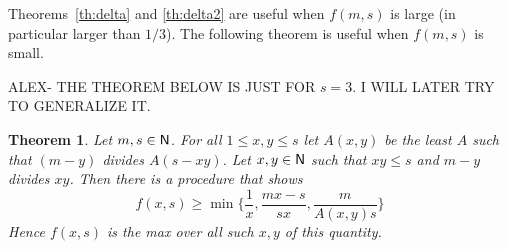 \documentclass[12pt]{article}
\newcommand{\nat}{{\sf N}}
\newtheorem{theoremfoo}{Theorem}[section] %
\newenvironment{theorem}{\pagebreak[1]\begin{theoremfoo}}{\end{theoremfoo}}
\newenvironment{proof}
    {\pagebreak[1]{\narrower\noindent {\bf Proof:\quad\nopagebreak}}}{\QED}
\newcommand{\yyskip}{\penalty-50\vskip 5pt plus 3pt minus 2pt}
\newcommand{\blackslug}{\hbox{\hskip 1pt
        \vrule width 4pt height 8pt depth 1.5pt\hskip 1pt}}
\newcommand{\QED}{{\penalty10000\parindent 0pt\penalty10000
        \hskip 8 pt\nolinebreak\blackslug\hfill\lower 8.5pt\null}
        \par\yyskip\pagebreak[1]}
\begin{document}
\begin{comment}
\begin{theorem}\label{th:delta}
Let $m,s\in\nat$ and $0<\delta \le \frac{1}{2}$.
Assume there exists $x_1,y_1,x_2,y_2\in\nat$ such that the following hold:
\begin{enumerate}
\item
$x_1y_1=x_2y_2 \le m$.
\item
$x_1+x_2=s$.
\item
$y_1\delta = \frac{m}{s}$.
\item
$y_2(1-\delta) + \frac{m-x_1y_1}{x_2} = \frac{m}{s}$.
\item
$2m-2x_1y_1\equiv 0 \pmod {x_2}$.
\end{enumerate}
Then $f(m,s) \ge \min\{\delta,1-\delta\}$.
\end{theorem}

\begin{proof}

The following procedure show $f(m,s) \ge \min\{\delta,1-\delta\}$.

\begin{enumerate}
\item
$M_1,\ldots,\ldots,M_{x_1y_1}$ are divided $(\delta,1-\delta)$. 
(There are $x_1y_1$ $\delta$-sized pieces and $x_2y_2$ $(1-\delta)$-sized pieces).
\item
$M_{x_1y_1+1},\ldots,M_m$ are divided $(\frac{1}{2},\frac{1}{2})$. 
(There are $2m-2x_1y_1$ $\frac{1}{2}$-sized pieces.)
\item
$S_1,\ldots,S_{x_1}$ each get $y_1$ $\delta$-sized pieces. 
(Each get $y_1\delta=\frac{m}{s}$.)
\item
$S_{x_1+1},\ldots,S_s$ each get $y_2$ $(1-\delta)$-sized pieces and 
$\frac{2m-2x_1y_1}{x_2}$ $\frac{1}{2}$-sized pieces.

(Each get $y_2(1-\delta) + \frac{2m-2x_1y_1}{x_2}\times\frac{1}{2} = \frac{m}{s}$.)
\end{enumerate}
\end{proof}
\end{comment}

Theorems~\ref{th:delta} and \ref{th:delta2} are useful when $f(m,s)$ is large
(in particular larger than $1/3$). The following theorem is useful when $f(m,s)$ is small.

ALEX- THE THEOREM BELOW IS JUST FOR $s=3$. I WILL LATER TRY TO GENERALIZE IT.

\vfill\eject

\begin{theorem}\label{th:three}
Let $m,s\in\nat$. For all $1\le x,y\le s$ let $A(x,y)$ be the least
$A$ such that $(m-y)$ divides $A(s-xy)$.
Let $x,y\in \nat$ such that 
$xy\le s$ and $m-y$ divides $xy$.
Then there is a procedure that shows
$$
f(x,s)\ge 
\min 
\biggl \{ 
\frac{1}{x},\frac{mx-s}{sx},\frac{m}{A(x,y)s} 
\biggr \}
$$
Hence $f(x,s)$ is the max over all such $x,y$ of this quantity.
\end{theorem}
\end{document}
